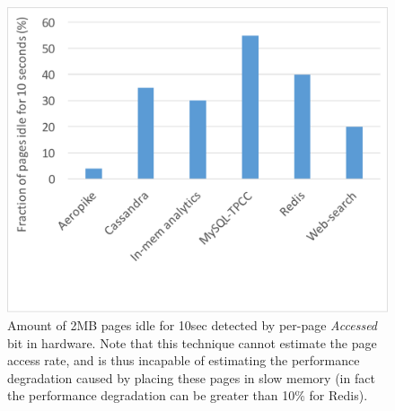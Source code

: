 %
\begin{figure}[t]
\centering
\includegraphics[width=1.0\columnwidth]{asplos2017/figures/kstaled-cold-data-10s}
\caption{Amount of 2MB pages idle for 10sec detected by per-page {\it Accessed} bit
in hardware. Note that this technique cannot estimate the page access rate, and
is thus incapable of estimating the performance degradation caused by placing
these pages in slow memory (in fact the performance degradation can be greater
than 10\% for Redis).}
\label{fig:motivation}
\end{figure}

